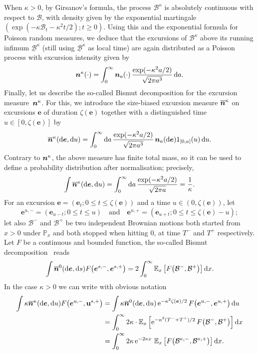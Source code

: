\documentclass[10pt]{amsart}
\newcommand{\bme}{\boldsymbol{e}}
\newcommand{\bmn}{\protect\boldsymbol{n}}
\theoremstyle{plain}
\theoremstyle{definition}
\theoremstyle{remark}
\renewcommand{\P}{\mathbb{P}}
\newcommand{\E}{\mathbb{E}}
\newcommand{\e}{\operatorname{e}}
\renewcommand{\d}{\mathop{}\!\mathrm{d}}
\begin{document}
When $\kappa\!>\!0$, by Girsanov's formula, the process $\mathcal{B}^\kappa$ is absolutely continuous with respect to $\mathcal{B}$, with density given by the exponential martingale \hbox{$(\exp(-\kappa \mathcal{B}_t \!-\! \kappa^2t/2) ; t \!\!\ge\! 0)$}. Using this and the exponential formula for Poisson random measures, we deduce that the excursions of $\mathcal{B}^{\kappa}$ above its running infimum $\underline{\mathcal{B}}^{\kappa}$ (still using $\underline{\mathcal{B}}^{\kappa}$ as local time) are again distributed as a Poisson process with excursion intensity given by
\[
\bmn^{\kappa}(\cdot) = \int_0^\infty \bmn_a(\cdot)\, \frac{\exp(-\kappa^2 a/2)}{\sqrt{2\pi a^3}} \d a.
\]
Finally, let us describe the so-called Bismut decomposition for the excursion measure~$\bmn^{\kappa}$. For this, we introduce the size-biased excursion measure $\overline{\bmn}^{\kappa}$ on excursions $\bme$ of duration $\zeta(\bme)$ together with a distinguished time $u \in [0, \zeta(\bme)]$ by
\begin{equation}\label{eq:excursion_biaisee}
\overline{\bmn}^{\kappa}(\d \bme, \d u) = \int_0^\infty \d a\, \frac{\exp(-\kappa^2 a/2)}{\sqrt{2\pi a^3}}\, \bmn_a(\d \bme) 1_{[0,a]}(u) \d u.
\end{equation}
Contrary to $\bmn^{\kappa}$, the above measure has finite total mass, so it can be used to define a probability distribution after normalisation; precisely,
\[
\int \overline{\bmn}^{\kappa}(\d \bme, \d u) = \int_0^\infty \d a\, \frac{\exp(-\kappa^2 a/2)}{\sqrt{2\pi a}} = \frac{1}{\kappa}.
\]
For an excursion $\bme=(\bme_t ; 0 \le t \le \zeta(\bme))$ and a time $u \in (0, \zeta(\bme))$, let
\[
\bme^{u,-} = (\bme_{u-t} ; 0\le t \le u)\quad\text{and}\quad \bme^{u,+} = (\bme_{u+t} ; 0\le t \le \zeta(\bme)-u);
\]
let also $\mathcal{B}^-$ and $\mathcal{B}^+$ be two independent Brownian motions both started from $x>0$ under $\P_x$ and both stopped when hitting $0$, at time $T^-$ and $T^+$ respectively. Let $F$ be a continuous and bounded function, the so-called Bismut decomposition~\cite[Th.\,4.7, Chap.\,XII, p.\,502]{RY99} reads
\[
\int \overline{\bmn}^{0}(\d \bme, \d s) F\big(\bme^{s,-}, \bme^{s,+}\big)
= 2 \int_0^\infty \E_x\left[F\big(\mathcal{B}^-, \mathcal{B}^+\big)\right] \d x.
\]
In the case $\kappa >0$ we can write with obvious notation
\begin{align*}
\int \kappa \overline{\bmn}^{\kappa}(\d \bme, \d u) F\big(\bme^{u,-}, \mathbf{u}^{s,+}\big)
&= \int \kappa \overline{\bmn}^{0} (\d \bme, \d u) \e^{-\kappa^2\zeta(\bme)/2} F \big(\bme^{u,-}, \bme^{u,+}\big) \d u
\\
&= \int_0^\infty 2\kappa \cdot \E_x\left[\e^{-\kappa^2 (T^-+T^+)/2} F\big(\mathcal{B}^-, \mathcal{B}^+\big)\right] \d x
\\
&= \int_0^\infty 2\kappa \e^{-2 \kappa x} \, \E_x\left[F\big(\mathcal{B}^{\kappa,-}, \mathcal{B}^{\kappa,+}\big)\right] \d x.
\end{align*}
\end{document}

